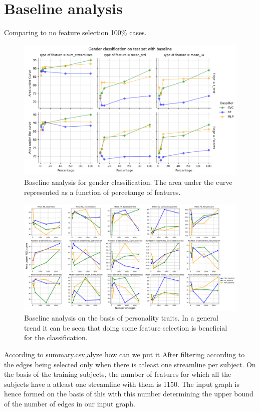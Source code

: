 \documentclass[msthesis.tex]{subfiles}
\begin{document}
\section{Baseline analysis}
Comparing to no feature selection 100\% cases.
\begin{figure}
    \centering
    \includegraphics[width=\textwidth]{images/baseline_results_gender.png}
    \caption{Baseline analysis for gender classification. The area under the curve represented as a function of percetange of features. }
    \label{fig:my_label}
\end{figure}
\begin{figure}
    \centering
    \includegraphics[width=\textwidth]{images/combined_clf_auc_base_personality.png}
    \caption{Baseline analysis on the basis of personality traits. In a general trend it can be seen that doing some feature selection is beneficial for the classification.}
    \label{fig:persona base}
\end{figure}
According to summary.csv,alyze how can we put it
After filtering according to the edges being selected only when there is atleast one streamline per subject. On the basis of the training subjects, the number of features for which all the subjects have a atleast one streamline with them is 1150. The input graph is hence formed on the basis of this with this number determining the upper bound of the number of edges in our input graph. 
\end{document}
